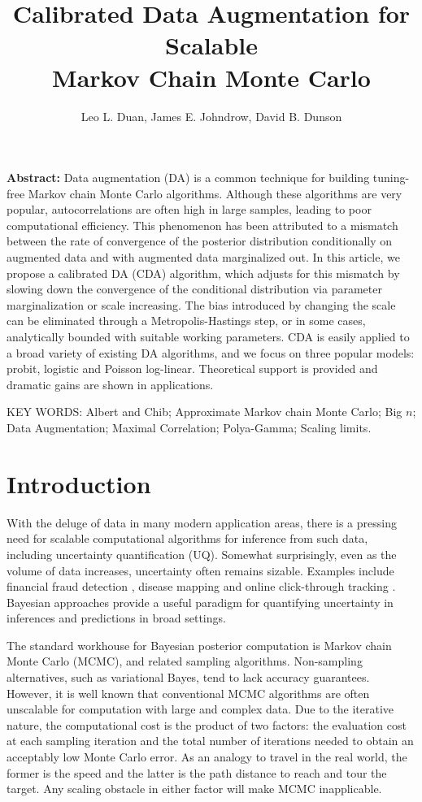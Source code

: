 \documentclass[10pt]{article}
\title
{{Calibrated Data Augmentation for Scalable \\ Markov Chain Monte Carlo}}
\author{
     Leo L. Duan,
     James E. Johndrow,
     David B. Dunson
}
\begin{document}
    
\maketitle

{\bf Abstract:} Data augmentation (DA) is a common technique for building tuning-free Markov chain Monte Carlo algorithms. Although these algorithms are very popular, 
autocorrelations are often high in large samples, leading to poor computational efficiency.  This phenomenon has been attributed to a mismatch between the rate of convergence of the posterior distribution conditionally on augmented data and with augmented data marginalized out.  In this article, we propose a calibrated DA (CDA) algorithm, which adjusts for this mismatch by slowing down the convergence of the conditional distribution via parameter marginalization or scale increasing. The bias introduced by changing the scale can be eliminated through a Metropolis-Hastings step, or in some cases, analytically bounded with suitable working parameters. CDA is easily applied to a broad variety of existing DA algorithms, and we focus on three popular models: probit, logistic and Poisson log-linear.  Theoretical support is provided and dramatic gains are shown in applications.
\vskip 12pt

{\noindent  KEY WORDS:  Albert and Chib; Approximate Markov chain Monte Carlo; Big $n$; Data Augmentation; Maximal Correlation; Polya-Gamma; Scaling limits.}
{}

\section{Introduction}

With the deluge of data in many modern application areas, there is a pressing need for scalable computational algorithms for inference from such data, including uncertainty quantification (UQ).  Somewhat surprisingly, even as the volume of data increases, uncertainty often remains sizable.  Examples include financial fraud detection \citep{ngai2011application}, disease mapping \citep{wakefield2007disease} and online click-through tracking \citep{wang2010click}.  Bayesian approaches provide a useful paradigm for quantifying uncertainty in inferences and predictions in broad settings.

The standard workhouse for Bayesian posterior computation is Markov chain Monte Carlo (MCMC), and related sampling algorithms. Non-sampling alternatives, such as variational Bayes, tend to lack accuracy guarantees. However, it is well known that conventional MCMC algorithms are often unscalable for computation with large and complex data. Due to the iterative nature, the computational cost is the product of two factors: the evaluation cost at each sampling iteration and the total number of iterations needed to obtain an acceptably low Monte Carlo error.  As an analogy to travel in the real world, the former is the speed and the latter is the path distance to reach and tour the target.  Any scaling obstacle in either factor will make MCMC inapplicable. 
\end{document}
